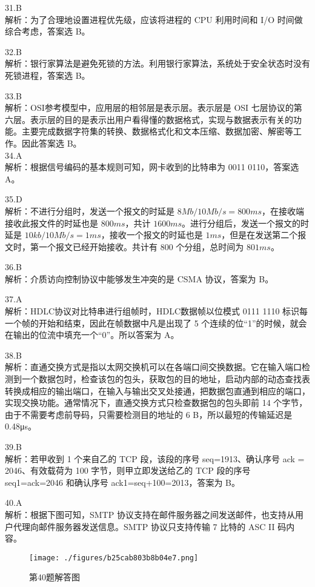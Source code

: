 31.B \\
解析：为了合理地设置进程优先级，应该将进程的 CPU 利用时间和 I/O 时间做综合考虑，答案选 B。

32.B \\
解析：银行家算法是避免死锁的方法。利用银行家算法，系统处于安全状态时没有死锁进程，答案选 B。

33.B \\
解析：OSI参考模型中，应用层的相邻层是表示层。表示层是 OSI 七层协议的第六层。表示层的目的是表示出用户看得懂的数据格式，实现与数据表示有关的功能。主要完成数据字符集的转换、数据格式化和文本压缩、数据加密、解密等工作。因此答案选 B。 \\

34.A \\
解析：根据信号编码的基本规则可知，网卡收到的比特串为 0011 0110，答案选 A。

35.D \\
解析：不进行分组时，发送一个报文的时延是 $8Mb/10Mb/s=800ms$，在接收端接收此报文件的时延也是 $800ms$，共计 $1600ms$。进行分组后，发送一个报文的时延是 $10kb/10Mb/s=1ms$，接收一个报文的时延也是 $1ms$，但是在发送第二个报文时，第一个报文已经开始接收。共计有 $800$ 个分组，总时间为 $801ms$。

36.B \\
解析：介质访向控制协议中能够发生冲突的是 CSMA 协议，答案为 B。

37.A \\
解析：HDLC协议对比特串进行组帧时，HDLC数据帧以位模式 0111 1110 标识每一个帧的开始和结束，因此在帧数据中凡是出现了 5 个连续的位“1”的时候，就会在输出的位流中填充一个“0”。所以答案为 A。

38.B \\
解析：直通交换方式是指以太网交换机可以在各端口间交换数据。它在输入端口检测到一个数据包时，检查该包的包头，获取包的目的地址，启动内部的动态查找表转换成相应的输出端口，在输入与输出交叉处接通，把数据包直通到相应的端口，实现交换功能。通常情况下，直通交换方式只检查数据包的包头即前 14 个字节，由于不需要考虑前导码，只需要检测目的地址的 6 B，所以最短的传输延迟是 0.48μs。

39.B \\
解析：若甲收到 1 个来自乙的 TCP 段，该段的序号 seq=1913、确认序号 ack = 2046、有效载荷为 100 字节，则甲立即发送给乙的 TCP 段的序号 seq1=ack=2046 和确认序号 ack1=seq+100=2013，答案为 B。

40.A \\
解析：根据下图可知，SMTP 协议支持在邮件服务器之间发送邮件，也支持从用户代理向邮件服务器发送信息。SMTP 协议只支持传输 7 比特的 ASC II 码内容。
\begin{figure}[ht]
\centering
\texttt{[image: ./figures/b25cab803b8b04e7.png]}
\caption{第40题解答图} \label{fig_CSN13_12}
\end{figure}

